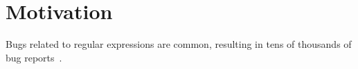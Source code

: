 \section{Motivation}

Bugs related to regular expressions are common, resulting in tens of thousands of bug reports~\cite{Spishak:2012:TSR:2318202.2318207}. 
